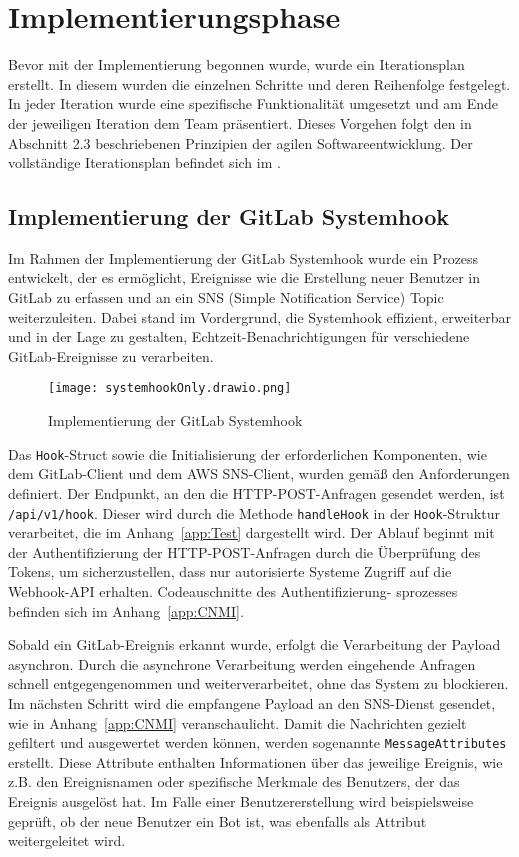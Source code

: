 \section{Implementierungsphase} 
\label{sec:Implementierungsphase}

Bevor mit der Implementierung begonnen wurde, wurde ein Iterationsplan erstellt. In diesem wurden die einzelnen Schritte und deren Reihenfolge festgelegt. In jeder Iteration wurde eine spezifische Funktionalität umgesetzt und am Ende der jeweiligen Iteration dem Team präsentiert. Dieses Vorgehen folgt den in Abschnitt 2.3 beschriebenen Prinzipien der agilen Softwareentwicklung. Der vollständige Iterationsplan befindet sich im .

\subsection{Implementierung der GitLab Systemhook}
\label{sec:ImplementierungGitlabSystemhook}

Im Rahmen der Implementierung der GitLab Systemhook wurde ein Prozess entwickelt, der es ermöglicht, Ereignisse wie die Erstellung neuer Benutzer in GitLab zu erfassen und an ein SNS (Simple Notification Service) Topic weiterzuleiten. Dabei stand im Vordergrund, die Systemhook effizient, erweiterbar und in der Lage zu gestalten, Echtzeit-Benachrichtigungen für verschiedene GitLab-Ereignisse zu verarbeiten.

\begin{figure}[htb]
    \centering
    \texttt{[image: systemhookOnly.drawio.png]}
    \caption{Implementierung der GitLab Systemhook}
\end{figure}

Das \texttt{Hook}-Struct sowie die Initialisierung der erforderlichen Komponenten, wie dem GitLab-Client und dem AWS SNS-Client, wurden gemäß den Anforderungen definiert. Der Endpunkt, an den die HTTP-POST-Anfragen gesendet werden, ist \texttt{/api/v1/hook}. Dieser wird durch die Methode \texttt{handleHook} in der \texttt{Hook}-Struktur verarbeitet, die im Anhang~\ref{app:Test} dargestellt wird. Der Ablauf beginnt mit der Authentifizierung der HTTP-POST-Anfragen durch die Überprüfung des Tokens, um sicherzustellen, dass nur autorisierte Systeme Zugriff auf die Webhook-API erhalten. Codeauschnitte des
Authentifizierung-
sprozesses befinden sich im Anhang~\ref{app:CNMI}.

Sobald ein GitLab-Ereignis erkannt wurde, erfolgt die Verarbeitung der Payload asynchron. Durch die asynchrone Verarbeitung werden eingehende Anfragen schnell entgegengenommen und weiterverarbeitet, ohne das System zu blockieren. Im nächsten Schritt wird die empfangene Payload an den SNS-Dienst gesendet, wie in Anhang~\ref{app:CNMI} veranschaulicht. Damit die Nachrichten gezielt gefiltert und ausgewertet werden können, werden sogenannte \texttt{MessageAttributes} erstellt. Diese Attribute enthalten Informationen über das jeweilige Ereignis, wie z.B. den Ereignisnamen oder spezifische Merkmale des Benutzers, der das Ereignis ausgelöst hat. Im Falle einer Benutzererstellung wird beispielsweise geprüft, ob der neue Benutzer ein Bot ist, was ebenfalls als Attribut weitergeleitet wird.

